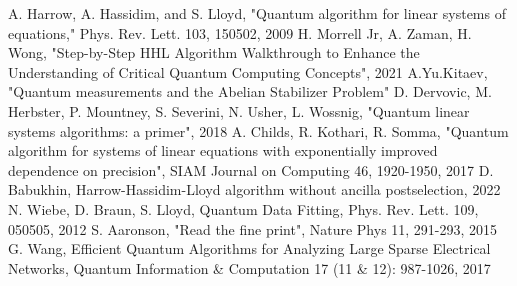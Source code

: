 
\begin{thebibliography}{00}
 A. Harrow, A. Hassidim, and S. Lloyd, "Quantum algorithm for linear systems of equations," Phys. Rev. Lett. 103, 150502, 2009
 H. Morrell Jr, A. Zaman, H. Wong, "Step-by-Step HHL Algorithm Walkthrough to Enhance the Understanding of Critical Quantum Computing Concepts", 2021
 A.Yu.Kitaev, "Quantum measurements and the Abelian Stabilizer Problem"
 D. Dervovic, M. Herbster, P. Mountney, S. Severini, N. Usher, L. Wossnig, "Quantum linear systems algorithms: a primer", 2018
 A. Childs, R. Kothari, R. Somma, "Quantum algorithm for systems of linear equations with exponentially improved dependence on precision", SIAM Journal on Computing 46, 1920-1950, 2017
 D. Babukhin, Harrow-Hassidim-Lloyd algorithm without ancilla postselection, 2022
 N. Wiebe, D. Braun, S. Lloyd, Quantum Data Fitting, Phys. Rev. Lett. 109, 050505, 2012
 S. Aaronson, "Read the fine print",  Nature Phys 11, 291-293, 2015 
 G. Wang, Efficient Quantum Algorithms for Analyzing Large Sparse Electrical Networks, Quantum Information \& Computation 17 (11 \& 12): 987-1026, 2017 
\end{thebibliography}



\begin{comment}
    HHL-2009: 
    step by step: 
    primer: https://arxiv.org/abs/1802.08227
    exponential imprved dependencs on precision: https://arxiv.org/abs/1511.02306
    without ancilla: https://arxiv.org/abs/2208.02200
    data fitting:
    fineprint: https://inspirehep.net/literature/1834407
    large electrical networks: https://arxiv.org/abs/1311.1851
    qiskit example: https://learn.qiskit.org/course/ch-applications/solving-linear-systems-of-equations-using-hhl-and-its-qiskit-implementation#example1


    QPE: https://arxiv.org/abs/quant-ph/9511026
\end{comment}
